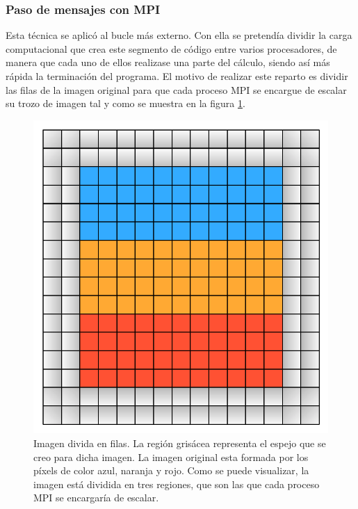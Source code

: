 \documentclass{article}
\begin{document}
\subsubsection{Paso de mensajes con MPI}
Esta técnica se aplicó al bucle más externo. Con ella se pretendía dividir la carga computacional que crea este segmento de código entre varios procesadores, de manera que cada uno de ellos realizase una parte del cálculo, siendo así más rápida la terminación del programa. El motivo de realizar este reparto es dividir las filas de la imagen original para que cada proceso MPI se encargue de escalar su trozo de imagen tal y como se muestra en la figura \ref{fig:repartoFilas}\cite{MPICH2, OpenMPI}.

\begin{figure}[h]
        \centering
        \includegraphics[angle=0, height=0.3\textheight]{img/repartoFilas.pdf}
        \caption{Imagen divida en filas. La región grisácea representa el espejo que se creo para dicha imagen. La imagen original esta formada por los píxels de color azul, naranja y rojo. Como se puede visualizar, la imagen está dividida en tres regiones, que son las que cada proceso MPI se encargaría de escalar.}
        \label{fig:repartoFilas}
\end{figure}
\end{document}
